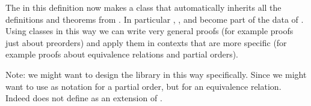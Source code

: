 \documentclass[letterpaper,10pt,english]{sphinxmanual}
\begin{document}
\begin{sphinxVerbatim}[commandchars=\\\{\}]
  

  

    

       
         
      
      

          
      

         
     

  
\end{sphinxVerbatim}

\sphinxAtStartPar
The  in this definition now makes
 a class that automatically
inherits all the definitions and theorems from .
In particular , , and  become part of the data of
.
Using classes in this way we can write very general proofs
(for example proofs just about preorders)
and apply them in contexts that are more specific
(for example proofs about equivalence relations and partial orders).

\sphinxAtStartPar
Note: we might  want to design the library in this way specifically.
Since we might want to use  as notation for a partial order,
but for an equivalence relation.
Indeed  does not define  as an extension of
.
\end{document}
